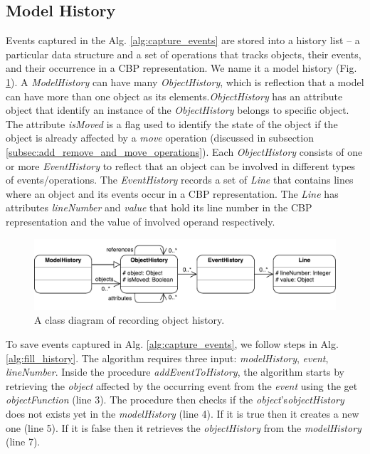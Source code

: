 \documentclass{llncs}
\begin{document}
\subsection{Model History}
\label{sec:model_history}
Events captured in the Alg. \ref{alg:capture_events} are stored into a  history list -- a particular data structure and a set of operations that tracks objects, their events, and their  occurrence in a CBP representation. We name it a model history (Fig. \ref{fig:object_history}). A \emph{ModelHistory} can have many \emph{ObjectHistory}, which is reflection that a model can have more than one object as its elements.\emph{ObjectHistory} has an attribute object that identify an instance of the \emph{ObjectHistory} belongs to specific object. The attribute \emph{isMoved} is a flag used to identify the state of the object if the object is already affected by a \emph{move} operation (discussed in subsection \ref{subsec:add_remove_and_move_operations}). Each \emph{ObjectHistory} consists of one or more \emph{EventHistory} to reflect that an object can be involved in different types of events/operations. The \emph{EventHistory} records a set of \emph{Line} that contains lines where an object and its events occur in a CBP representation. The \emph{Line} has attributes \emph{lineNumber} and \emph{value} that hold its line number in the CBP representation and the value of involved operand respectively.

\begin{figure}[ht]
\centering
\includegraphics[width=\linewidth]{object_history}
\caption{A class diagram of recording object history.}
\label{fig:object_history}
\end{figure}

To save events captured in Alg. \ref{alg:capture_events}, we follow steps in Alg. \ref{alg:fill_history}. The algorithm requires three input: \emph{modelHistory}, \emph{event}, \emph{lineNumber}.  Inside the procedure \emph{addEventToHistory}, the algorithm starts by retrieving the \emph{object} affected by the occurring event from the \emph{event} using the get \emph{objectFunction} (line 3). The procedure then checks if the \emph{object}'s\emph{objectHistory} does not exists yet in the \emph{modelHistory} (line 4). If it is true then it creates a new one (line 5). If it is false then it retrieves the \emph{objectHistory} from the \emph{modelHistory} (line 7). 
\end{document}
